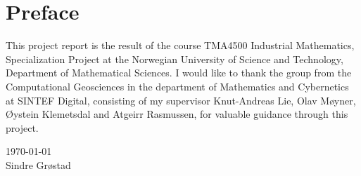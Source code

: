 {}
\chapter*{Preface}
This project report is the result of the course TMA4500 Industrial Mathematics, Specialization Project at the Norwegian University of Science and Technology, Department of Mathematical Sciences. I would like to thank the group from the Computational Geosciences in the department of Mathematics and Cybernetics at SINTEF Digital, consisting of my supervisor Knut-Andreas Lie, Olav Møyner, Øystein Klemetsdal and Atgeirr Rasmussen, for valuable guidance through this project.

\today \\
Sindre Grøstad